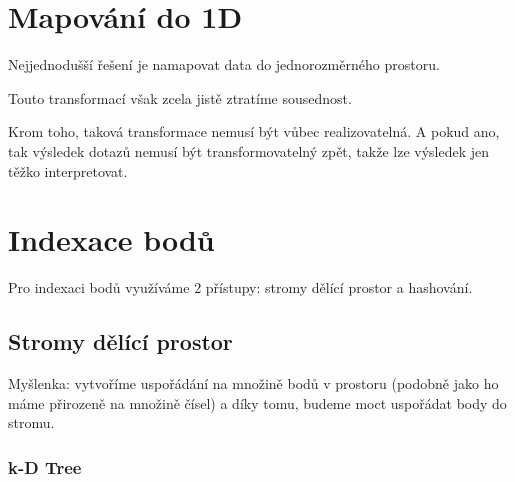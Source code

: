 \section{Mapování do 1D}

\begin{compactitem}
    \item Nejjednodušší řešení je namapovat data do jednorozměrného prostoru.
    \item Touto transformací však zcela jistě ztratíme sousednost.
    \item Krom toho, taková transformace nemusí být vůbec realizovatelná. A pokud ano, tak výsledek dotazů nemusí být transformovatelný zpět, takže lze výsledek jen těžko interpretovat.
\end{compactitem}


\section{Indexace bodů}

\begin{compactitem}
    \item Pro indexaci bodů využíváme 2 přístupy: stromy dělící prostor a hashování.
\end{compactitem}

\subsection{Stromy dělící prostor}

\begin{compactitem}
    \item Myšlenka: vytvoříme uspořádání na množině bodů v prostoru (podobně jako ho máme přirozeně na množině čísel) a díky tomu, budeme moct uspořádat body do stromu.
\end{compactitem}

\subsubsection{k-D Tree}

